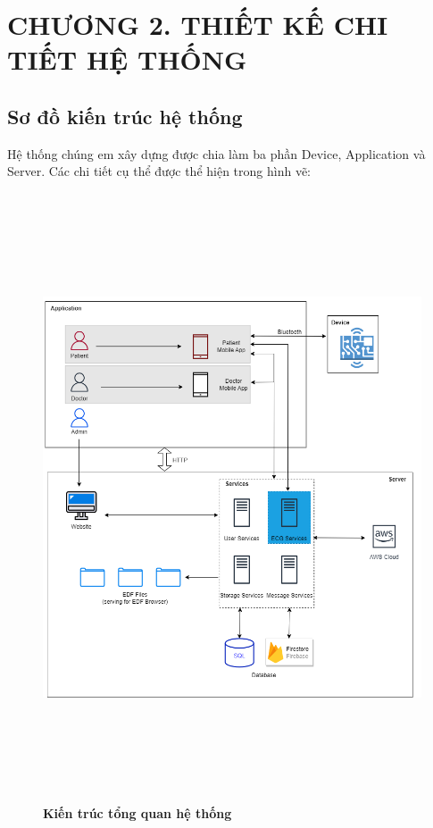 
\section*{CHƯƠNG 2. THIẾT KẾ CHI TIẾT HỆ THỐNG}
\setcounter{section}{2}
\setcounter{subsection}{0} %
\setcounter{table}{0} %
\setcounter{figure}{0} %

\subsection{Sơ đồ kiến trúc hệ thống}
Hệ thống chúng em xây dựng được chia làm ba phần Device, Application và Server. Các chi tiết cụ thể được thể hiện trong
hình vẽ:

\begin{figure}[H]
  \centering
  \includegraphics[width=16cm,height=18cm]{Images/system/fmECG_architecture-System Architecture.drawio.png}
  \caption[Kiến trúc tổng quan hệ thống]{\bfseries \fontsize{12pt}{0pt}\selectfont Kiến trúc tổng quan hệ thống}
  \label{fmECG_architecture-System} %
\end{figure}

